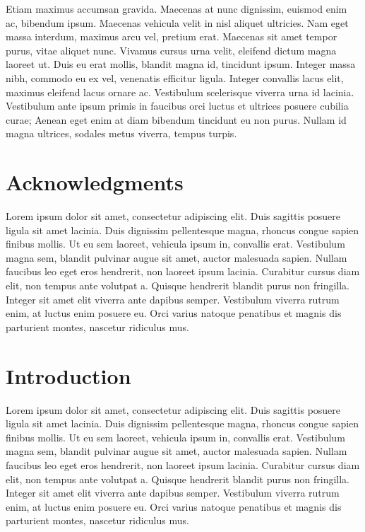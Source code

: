 \documentclass[
  a4paper,
  DIV=11,
  numbers=noendperiod]{scrreprt}
\begin{document}
Etiam maximus accumsan gravida. Maecenas at nunc dignissim, euismod enim
ac, bibendum ipsum. Maecenas vehicula velit in nisl aliquet ultricies.
Nam eget massa interdum, maximus arcu vel, pretium erat. Maecenas sit
amet tempor purus, vitae aliquet nunc. Vivamus cursus urna velit,
eleifend dictum magna laoreet ut. Duis eu erat mollis, blandit magna id,
tincidunt ipsum. Integer massa nibh, commodo eu ex vel, venenatis
efficitur ligula. Integer convallis lacus elit, maximus eleifend lacus
ornare ac. Vestibulum scelerisque viverra urna id lacinia. Vestibulum
ante ipsum primis in faucibus orci luctus et ultrices posuere cubilia
curae; Aenean eget enim at diam bibendum tincidunt eu non purus. Nullam
id magna ultrices, sodales metus viverra, tempus turpis.

\newpage{}


\chapter*{Acknowledgments}\label{acknowledgments}


Lorem ipsum dolor sit amet, consectetur adipiscing elit. Duis sagittis
posuere ligula sit amet lacinia. Duis dignissim pellentesque magna,
rhoncus congue sapien finibus mollis. Ut eu sem laoreet, vehicula ipsum
in, convallis erat. Vestibulum magna sem, blandit pulvinar augue sit
amet, auctor malesuada sapien. Nullam faucibus leo eget eros hendrerit,
non laoreet ipsum lacinia. Curabitur cursus diam elit, non tempus ante
volutpat a. Quisque hendrerit blandit purus non fringilla. Integer sit
amet elit viverra ante dapibus semper. Vestibulum viverra rutrum enim,
at luctus enim posuere eu. Orci varius natoque penatibus et magnis dis
parturient montes, nascetur ridiculus mus.

\newpage{}

\tableofcontents

\newpage{}


\chapter{Introduction}\label{introduction}


Lorem ipsum dolor sit amet, consectetur adipiscing elit. Duis sagittis
posuere ligula sit amet lacinia. Duis dignissim pellentesque magna,
rhoncus congue sapien finibus mollis. Ut eu sem laoreet, vehicula ipsum
in, convallis erat. Vestibulum magna sem, blandit pulvinar augue sit
amet, auctor malesuada sapien. Nullam faucibus leo eget eros hendrerit,
non laoreet ipsum lacinia. Curabitur cursus diam elit, non tempus ante
volutpat a. Quisque hendrerit blandit purus non fringilla. Integer sit
amet elit viverra ante dapibus semper. Vestibulum viverra rutrum enim,
at luctus enim posuere eu. Orci varius natoque penatibus et magnis dis
parturient montes, nascetur ridiculus mus.
\end{document}
